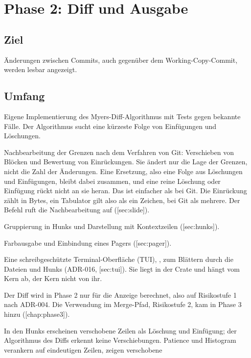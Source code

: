 \chapter[chap:phase2]{Phase 2: Diff und Ausgabe}

\section{Ziel}

Änderungen zwischen Commits, auch gegenüber dem Working-Copy-Commit, werden lesbar angezeigt.

\section{Umfang}

\startitemize
\item Eigene Implementierung des Myers-Diff-Algorithmus mit Tests gegen bekannte Fälle.
Der Algorithmus sucht eine kürzeste Folge von Einfügungen und Löschungen.
\item Nachbearbeitung der Grenzen nach dem Verfahren von Git: Verschieben von Blöcken
und Bewertung von Einrückungen. Sie ändert nur die Lage der Grenzen, nicht die Zahl der
Änderungen.
Eine Ersetzung, also eine Folge aus Löschungen und Einfügungen, bleibt dabei zusammen,
und eine reine Löschung oder Einfügung rückt nicht an sie heran. Das ist einfacher als bei Git.
Die Einrückung zählt in Bytes, ein Tabulator gilt also als ein Zeichen, bei Git als mehrere.
Der Befehl  ruft die Nachbearbeitung auf ([sec:slide]).
\item Gruppierung in Hunks und Darstellung mit Kontextzeilen ([sec:hunks]).
\item Farbausgabe und Einbindung eines Pagers ([sec:pager]).
\item Eine schreibgeschützte Terminal-Oberfläche (TUI), , zum Blättern durch
die Dateien und Hunks (ADR-016, [sec:tui]). Sie liegt in der Crate
 und hängt vom Kern ab, der Kern nicht von ihr.
\item Der Diff wird in Phase 2 nur für die Anzeige berechnet, also auf Risikostufe 1 nach ADR-004.
Die Verwendung im Merge-Pfad, Risikostufe 2, kam in Phase 3 hinzu ([chap:phase3]).
\item In den Hunks erscheinen verschobene Zeilen als Löschung und Einfügung; der Algorithmus
des Diffs erkennt keine Verschiebungen.
Patience und Histogram verankern auf eindeutigen Zeilen, zeigen verschobene
